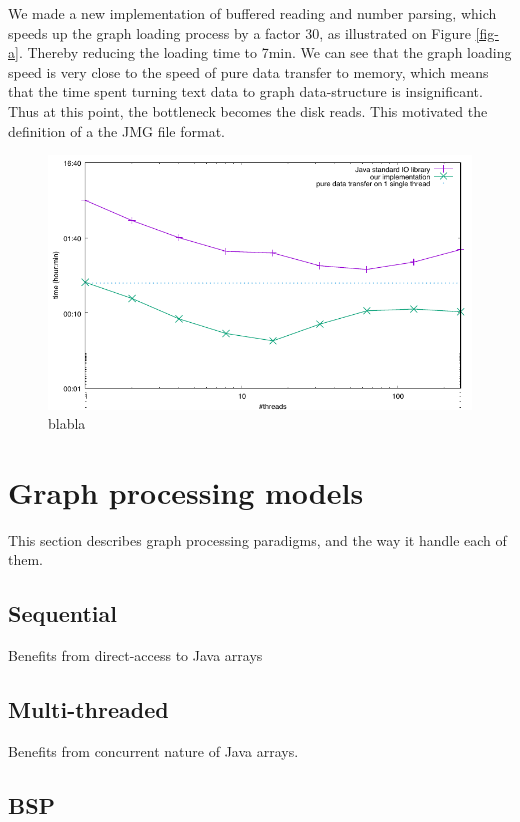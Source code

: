 \documentclass[11pt,a4paper]{article}
\begin{document}
We made a new implementation of buffered reading and number parsing, which speeds up the graph loading process by a factor 30, as illustrated on Figure \ref{fig-a}. Thereby reducing the loading time to 7min. We can see that the graph loading speed is very close to the speed of pure data transfer to memory, which means that the time spent turning text data to graph data-structure is insignificant. Thus at this point, the bottleneck becomes the disk reads. This motivated the definition of a the JMG file format.


\begin{figure}
\begin{center}
\includegraphics[width=0.8\linewidth]{load.pdf}
\end{center}
\caption{blabla}
\end{figure}





\section{Graph processing models}

This section describes 
graph processing paradigms, and the way it handle each of them.

\subsection{Sequential}

Benefits from direct-access to Java arrays

\subsection{Multi-threaded}

Benefits from concurrent nature of Java arrays.

\subsection{BSP}
\end{document}
